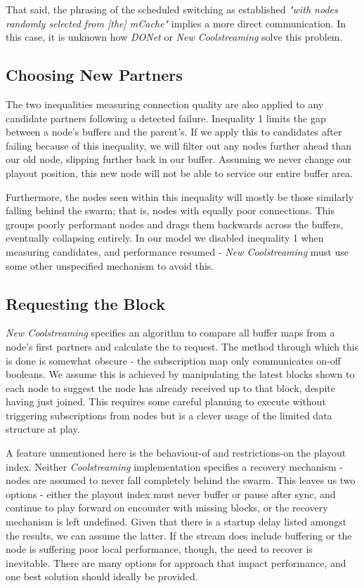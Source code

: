 \documentclass[12pt,a4paper]{article}
\begin{document}
That said, the phrasing of the scheduled switching as established \textit{"with nodes randomly selected from [the] mCache"} implies a more direct communication. In this case, it is unknown how \textit{DONet} or \textit{New Coolstreaming} solve this problem.

\subsection{Choosing New Partners} \label{problems:newpartners}
The two inequalities measuring connection quality are also applied to any candidate partners following a detected failure. Inequality 1 limits the gap between a node's  buffers and the parent's. If we apply this to candidates after failing because of this inequality, we will filter out any nodes further ahead than our old node, slipping further back in our buffer. Assuming we never change our playout position, this new node will not be able to service our entire buffer area.

Furthermore, the nodes seen within this inequality will mostly be those similarly falling behind the swarm; that is, nodes with equally poor connections. This groups poorly performant nodes and drags them backwards across the buffers, eventually collapsing entirely. In our model we disabled inequality 1 when measuring candidates, and performance resumed - \textit{New Coolstreaming} must use some other unspecified mechanism to avoid this.

\subsection{Requesting the Block} \label{problems:requesting}
\textit{New Coolstreaming} specifies an algorithm to compare all buffer maps from a node's first partners and calculate the  to request. The method through which this is done is somewhat obscure - the subscription map only communicates on-off booleans. We assume this is achieved by manipulating the latest blocks shown to each node to suggest the node has already received up to that block, despite having just joined. This requires some careful planning to execute without triggering subscriptions from nodes but is a clever usage of the limited data structure at play.

A feature unmentioned here is the behaviour-of and restrictions-on the playout index. Neither \textit{Coolstreaming} implementation specifies a recovery mechanism - nodes are assumed to never fall completely behind the swarm. This leaves us two options - either the playout index must never buffer or pause after sync, and continue to play forward on encounter with missing blocks, or the recovery mechanism is left undefined. Given that there is a startup delay listed amongst the results, we can assume the latter. If the stream does include buffering or the node is suffering poor local performance, though, the need to recover is inevitable. There are many options for approach that impact performance, and one best solution should ideally be provided.
\end{document}
